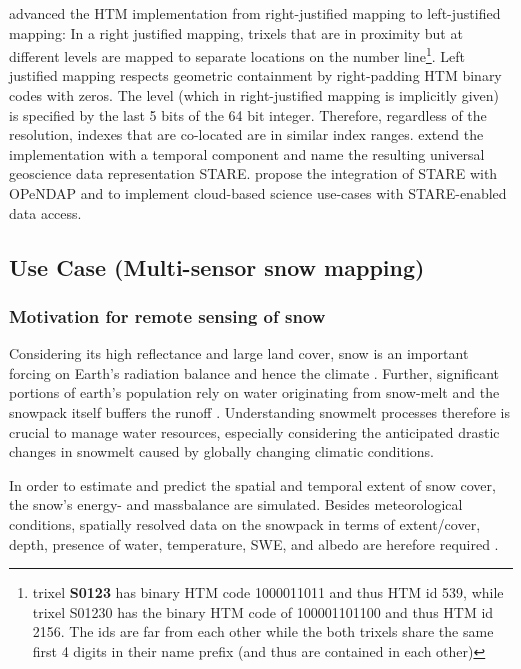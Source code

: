 \documentclass[a4paper,10pt]{article}
\begin{document}
\cite{Rilee2016} advanced the HTM implementation from right-justified mapping to left-justified mapping:
In a right justified mapping, trixels that are in proximity but at different levels are mapped to separate locations on the number line\footnote{trixel \textbf{S0123} has binary HTM code 1000011011 and thus HTM id 539, while trixel S01230 has the binary HTM code of 100001101100 and thus HTM id 2156. The ids are far from each other while the both trixels share the same first 4 digits in their name prefix (and thus are contained in each other)}.
Left justified mapping respects geometric containment by right-padding HTM binary codes with zeros.
The level (which in right-justified mapping is implicitly given) is specified by the last 5 bits of the 64 bit integer. Therefore, regardless of the resolution, indexes that are co-located are in similar index ranges.
\cite{Kuo2017} extend the implementation with a temporal component and name the resulting universal geoscience data representation \gls{STARE}.
\cite{Rilee2018} propose the integration of \gls{STARE} with \gls{OPeNDAP} and to implement cloud-based science use-cases with \gls{STARE}-enabled data access.

\newpage

\subsection{Use Case (Multi-sensor snow mapping)}

    
\subsubsection{Motivation for remote sensing of snow}
Considering its high reflectance and large land cover, snow is an important forcing on Earth's radiation balance and hence the climate \citep{Durand2017}.
Further, significant portions of earth's population rely on water originating from snow-melt \citep{Barnett2005, Durand2017} and the snowpack itself buffers the runoff \citep{Lettenmaier2015}.
Understanding snowmelt processes therefore is crucial to manage water resources, especially considering the anticipated drastic changes in snowmelt caused by globally changing climatic conditions. 

In order to estimate and predict the spatial and temporal extent of snow cover, the snow's energy- and massbalance are simulated. Besides meteorological conditions, spatially resolved data on the snowpack in terms of extent/cover, depth, presence of water, temperature, \gls{SWE}, and albedo are herefore required \citep{Dozier2004}.
\end{document}
